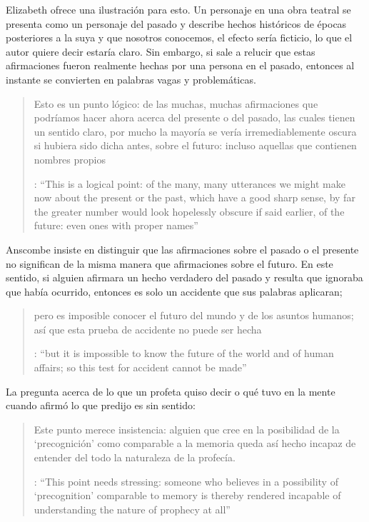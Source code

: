 Elizabeth ofrece una ilustración para esto. Un personaje en una obra teatral se presenta como un personaje del pasado y describe hechos históricos de épocas posteriores a la suya y que nosotros conocemos, el efecto sería ficticio, lo que el autor quiere decir estaría claro. Sin embargo, si sale a relucir que estas afirmaciones fueron realmente hechas por una persona en el pasado, entonces al instante se convierten en palabras vagas y problemáticas. \blockquote[{\cite[31]{anscombe2008faith:prophandmi}}: \enquote{This is a logical point: of the many, many utterances we might make now about the present or the past, which have a good sharp sense, by far the greater number would look hopelessly obscure if said earlier, of the future: even ones with proper names}]{Esto es un punto lógico: de las muchas, muchas afirmaciones que podríamos hacer ahora acerca del presente o del pasado, las cuales tienen un sentido claro, por mucho la mayoría se vería irremediablemente oscura si hubiera sido dicha antes, sobre el futuro: incluso aquellas que contienen nombres propios} Anscombe insiste en distinguir que las afirmaciones sobre el pasado o el presente no significan de la misma manera que afirmaciones sobre el futuro. En este sentido, si alguien afirmara un hecho verdadero del pasado y resulta que ignoraba que había ocurrido, entonces es solo un accidente que sus palabras aplicaran; \blockquote[{\cite[29]{anscombe2008faith:prophandmi}}: \enquote{but it is impossible to know the future of the world and of human affairs; so this test for accident cannot be made}]{pero es imposible conocer el futuro del mundo y de los asuntos humanos; así que esta prueba de accidente no puede ser hecha}. La pregunta acerca de lo que un profeta quiso decir o qué tuvo en la mente cuando afirmó lo que predijo es sin sentido: \blockquote[{\cite[29]{anscombe2008faith:prophandmi}}: \enquote{This point needs stressing: someone who believes in a possibility of `precognition' comparable to memory is thereby rendered incapable of understanding the nature of prophecy at all}]{Este punto merece insistencia: alguien que cree en la posibilidad de la `precognición' como comparable a la memoria queda así hecho incapaz de entender del todo la naturaleza de la profecía.}

